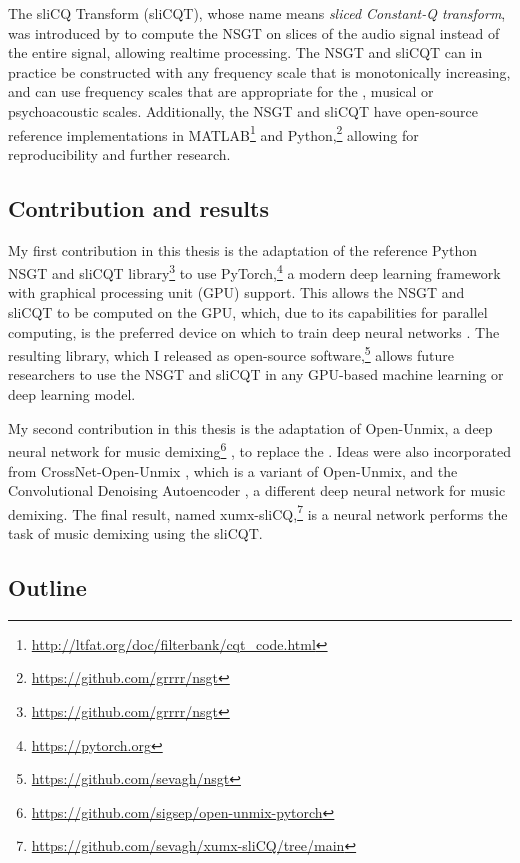 \documentclass[report.tex]{subfiles}
\begin{document}
The sliCQ Transform (sliCQT), whose name means \textit{sliced Constant-Q transform}, was introduced by \textcite{slicq} to compute the NSGT on slices of the audio signal instead of the entire signal, allowing realtime processing. The NSGT and sliCQT can in practice be constructed with any frequency scale that is monotonically increasing, and can use frequency scales that are appropriate for the , musical or psychoacoustic scales. Additionally, the NSGT and sliCQT have open-source reference implementations in MATLAB\footnote{\url{http://ltfat.org/doc/filterbank/cqt_code.html}} and Python,\footnote{\url{https://github.com/grrrr/nsgt}} allowing for reproducibility and further research.

\subsection{Contribution and results}

My first contribution in this thesis is the adaptation of the reference Python NSGT and sliCQT library\footnote{\url{https://github.com/grrrr/nsgt}} to use PyTorch,\footnote{\url{https://pytorch.org}} a modern deep learning framework with graphical processing unit (GPU) support. This allows the NSGT and sliCQT to be computed on the GPU, which, due to its capabilities for parallel computing, is the preferred device on which to train deep neural networks \parencite{pytorch}. The resulting library, which I released as open-source software,\footnote{\url{https://github.com/sevagh/nsgt}} allows future researchers to use the NSGT and sliCQT in any GPU-based machine learning or deep learning model.

My second contribution in this thesis is the adaptation of Open-Unmix, a deep neural network for music demixing\footnote{\url{https://github.com/sigsep/open-unmix-pytorch}} \parencite{umx}, to replace the . Ideas were also incorporated from CrossNet-Open-Unmix \parencite{xumx}, which is a variant of Open-Unmix, and the Convolutional Denoising Autoencoder \parencite{plumbley1}, a different deep neural network for music demixing. The final result, named xumx-sliCQ,\footnote{\url{https://github.com/sevagh/xumx-sliCQ/tree/main}} is a neural network  performs the task of music demixing using the sliCQT.

\subsection{Outline}
\end{document}
